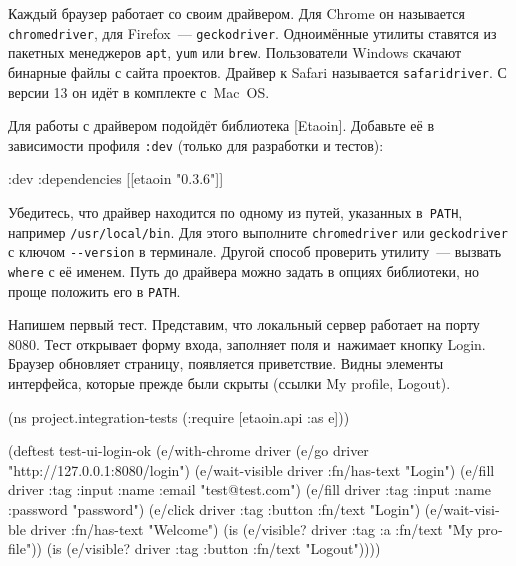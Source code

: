 
Каждый браузер работает со своим драйвером. Для Chrome он называется
\verb|chromedriver|, для Firefox~--- \verb|geckodriver|. Одноимённые утилиты
ставятся из пакетных менеджеров \verb|apt|, \verb|yum| или
\verb|brew|. Пользователи Windows скачают бинарные файлы с сайта
проектов. Драйвер к Safari называется \verb|safaridriver|. С версии 13 он
идёт в комплекте с~Mac~OS.


Для работы с драйвером подойдёт библиотека [Etaoin].
Добавьте её в зависимости профиля \verb|:dev| (только для разработки и тестов):

\begin{english}
  \begin{clojure}
:dev {:dependencies [[etaoin "0.3.6"]]}
  \end{clojure}
\end{english}

Убедитесь, что драйвер находится по одному из путей, указанных в~\verb|PATH|,
например \verb|/usr/local/bin|. Для этого выполните \verb|chromedriver| или
\verb|geckodriver| с ключом \verb|--version| в терминале. Другой способ
проверить утилиту~--- вызвать \verb|where| с её именем. Путь до драйвера можно
задать в опциях библиотеки, но проще положить его в \verb|PATH|.


Напишем первый тест. Представим, что локальный сервер работает на порту
8080. Тест открывает форму входа, заполняет поля и~нажимает кнопку
Login. Браузер обновляет страницу, появляется приветствие. Видны элементы
интерфейса, которые прежде были скрыты (ссылки My profile, Logout).


\ifx\devicetype\mobile

\begin{english}
  \begin{clojure}
(ns project.integration-tests
  (:require [etaoin.api :as e]))

(deftest test-ui-login-ok
  (e/with-chrome {} driver
    (e/go driver
      "http://127.0.0.1:8080/login")
    (e/wait-visible driver
      {:fn/has-text "Login"})
    (e/fill driver
      {:tag :input :name :email}
      "test@test.com")
    (e/fill driver
      {:tag :input :name :password}
      "password")
    (e/click driver
      {:tag :button :fn/text "Login"})
    (e/wait-visible driver
      {:fn/has-text "Welcome"})
    (is (e/visible? driver
          {:tag :a
           :fn/text "My profile"}))
    (is (e/visible? driver
          {:tag :button
           :fn/text "Logout"}))))
  \end{clojure}
\end{english}

